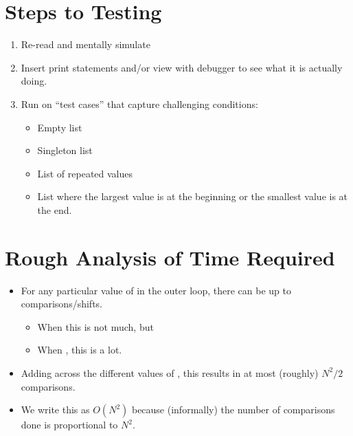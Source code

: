 \documentclass[letterpaper,10pt,english]{sphinxmanual}
\begin{document}
\section{Steps to Testing}
\label{\detokenize{lecture_notes/lec21_sorting:steps-to-testing}}\begin{enumerate}
\item {} 
Re-read and mentally simulate

\item {} 
Insert print statements and/or view with debugger to see what it is
actually doing.

\item {} 
Run on “test cases” that capture challenging conditions:
\begin{itemize}
\item {} 
Empty list

\item {} 
Singleton list

\item {} 
List of repeated values

\item {} 
List where the largest value is at the beginning or the smallest
value is at the end.

\end{itemize}

\end{enumerate}


\section{Rough Analysis of Time Required}
\label{\detokenize{lecture_notes/lec21_sorting:rough-analysis-of-time-required}}\begin{itemize}
\item {} 
For any particular value of  in the outer  loop, there
can be up to  comparisons/shifts.
\begin{itemize}
\item {} 
When  this is not much, but

\item {} 
When , this is a lot.

\end{itemize}

\item {} 
Adding across the different values of , this results in at most
(roughly) \(N^2/2\) comparisons.

\item {} 
We write this as \(O(N^2)\) because (informally) the number of
comparisons done is proportional to \(N^2\).

\end{itemize}
\end{document}
